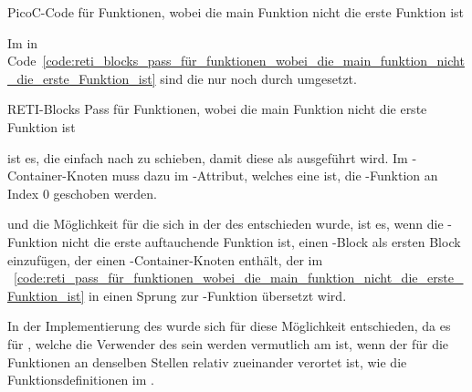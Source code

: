 \begin{code}
  \centering
  \caption{PicoC-Code für Funktionen, wobei die main Funktion nicht die erste Funktion ist}
  \label{code:picoc_code_für_funktionen_wobei_die_main_funktion_nicht_die_erste_Funktion_ist}
\end{code}

Im  in Code~\ref{code:reti_blocks_pass_für_funktionen_wobei_die_main_funktion_nicht_die_erste_Funktion_ist} sind die  nur noch durch  umgesetzt.

\begin{code}
  \centering
  \caption{RETI-Blocks Pass für Funktionen, wobei die main Funktion nicht die erste Funktion ist}
  \label{code:reti_blocks_pass_für_funktionen_wobei_die_main_funktion_nicht_die_erste_Funktion_ist}
\end{code}

 ist es, die  einfach nach  zu schieben, damit diese als  ausgeführt wird. Im -Container-Knoten muss dazu im -Attribut, welches eine  ist, die -Funktion an Index $0$ geschoben werden.

 und die Möglichkeit für die sich in der  des  entschieden wurde, ist es, wenn die -Funktion nicht die erste auftauchende Funktion ist, einen -Block als ersten Block einzufügen, der einen -Container-Knoten enthält, der im ~\ref{code:reti_pass_für_funktionen_wobei_die_main_funktion_nicht_die_erste_Funktion_ist} in einen Sprung zur -Funktion übersetzt wird.

In der Implementierung des  wurde sich für diese Möglichkeit entschieden, da es für , welche die Verwender des  sein werden vermutlich am  ist,  wenn der  für die Funktionen an denselben Stellen relativ zueinander verortet ist, wie die Funktionsdefinitionen im .

